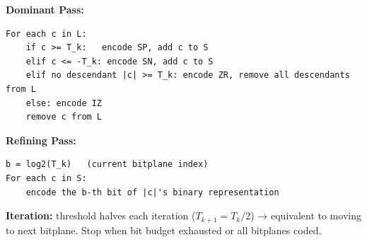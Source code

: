 \textbf{Dominant Pass:}

\begin{verbatim}
For each c in L:
    if c >= T_k:   encode SP, add c to S
    elif c <= -T_k: encode SN, add c to S
    elif no descendant |c| >= T_k: encode ZR, remove all descendants from L
    else: encode IZ
    remove c from L

\end{verbatim}

\textbf{Refining Pass:}

\begin{verbatim}
b = log2(T_k)   (current bitplane index)
For each c in S:
    encode the b-th bit of |c|'s binary representation

\end{verbatim}

\textbf{Iteration:} threshold halves each iteration ($T_{k+1} = T_k/2$) → equivalent to moving to next bitplane. Stop when bit budget exhausted or all bitplanes coded.

